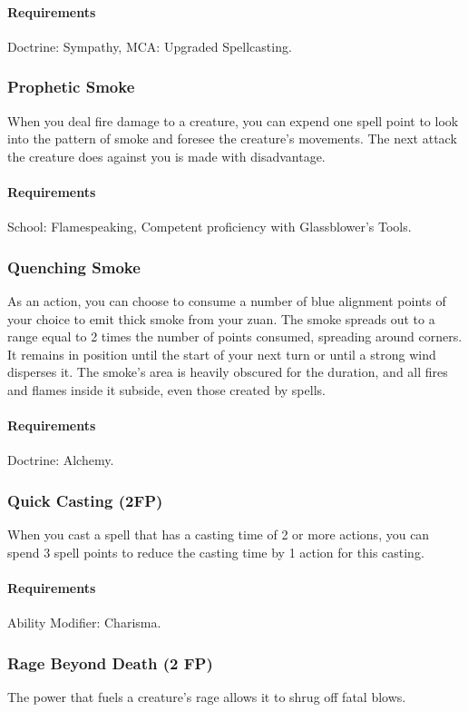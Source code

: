     \paragraph{Requirements} Doctrine: Sympathy, MCA: Upgraded Spellcasting.
\subsubsection{Prophetic Smoke} \label{feat::propheticsmoke}
    When you deal fire damage to a creature, you can expend one spell point to look into the pattern of smoke and foresee the creature's movements.
    The next attack the creature does against you is made with disadvantage.
    \paragraph{Requirements} School: Flamespeaking, Competent proficiency with Glassblower's Tools.
\subsubsection{Quenching Smoke} \label{feat::quenchingsmoke}
    As an action, you can choose to consume a number of blue alignment points of your choice to emit thick smoke from your zuan.
    The smoke spreads out to a range equal to 2 times the number of points consumed, spreading around corners.
    It remains in position until the start of your next turn or until a strong wind disperses it.
    The smoke's area is heavily obscured for the duration, and all fires and flames inside it subside, even those created by spells.
    \paragraph{Requirements} Doctrine: Alchemy.
\subsubsection{Quick Casting (2FP)} \label{feat::quickcasting}
    When you cast a spell that has a casting time of 2 or more actions, you can spend 3 spell points to reduce the casting time by 1 action for this casting.
    \paragraph{Requirements} Ability Modifier: Charisma.
\subsubsection{Rage Beyond Death (2 FP)} \label{feat::ragebeyonddeath}
    The power that fuels a creature's rage allows it to shrug off fatal blows.

